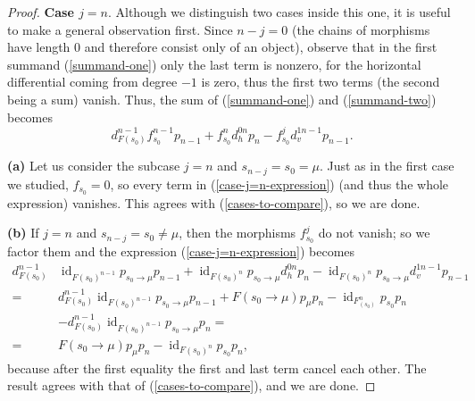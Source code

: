 \documentclass[reqno,11pt]{amsart}
\theoremstyle{plain}
\theoremstyle{remark}
\theoremstyle{definition}
\numberwithin{equation}{thm}
\DeclareMathOperator{\id}{id}
\begin{document}
\begin{proof}
		\textbf{Case $j=n$}. Although we distinguish two cases inside this one, it is useful to make a general observation first. Since $n-j=0$ (the chains of morphisms have length $0$ and therefore consist only of an object), observe that in the first summand (\ref{summand-one}) only the last term is nonzero, for the horizontal differential coming from degree $-1$ is zero, thus the first two terms (the second being a sum) vanish. Thus, the sum of (\ref{summand-one}) and (\ref{summand-two}) becomes
		\begin{equation}\label{case-j=n-expression}
			d_{F(s_0)}^{n-1} f_{s_0}^{n-1} p_{n-1} + f_{s_0}^{n} d_h^{0 n} p_n - f_{s_0}^j d_v^{1 n-1} p_{n-1}.
		\end{equation}
		
		\textbf{(a)} Let us consider the subcase $j=n$ and $s_{n-j}=s_0=\mu$. Just as in the first case we studied, $f_{s_0}=0$, so every term in (\ref{case-j=n-expression}) (and thus the whole expression) vanishes. This agrees with (\ref{cases-to-compare}), so we are done.
		
		\textbf{(b)} If $j=n$ and $s_{n-j}=s_0 \neq \mu$, then the morphisms $f_{s_0}^j$ do not vanish; so we factor them and the expression (\ref{case-j=n-expression}) becomes
		\small
		\begin{equation*}
			\begin{aligned}
				d_{F(s_0)}^{n-1}& \id_{F(s_0)^{n-1}} p_{s_0 \to \mu} p_{n-1} + \id_{F(s_0)^n} p_{s_0 \to \mu} d_h^{0n} p_n - \id_{F(s_0)^n} p_{s_0 \to \mu} d_v^{1 n-1} p_{n-1} \\
				=& d_{F(s_0)}^{n-1} \id_{F(s_0)^{n-1}} p_{s_0 \to \mu} p_{n-1} + F(s_0 \to \mu) p_{\mu} p_n - \id_{F_(s_0)^n} p_{s_0} p_n \\
				&- d_{F(s_0)}^{n-1} \id_{F(s_0)^{n-1}} p_{s_0 \to \mu} p_n = \\
				=& F(s_0 \to \mu) p_{\mu} p_n - \id_{F(s_0)^n} p_{s_0} p_n,
			\end{aligned}
		\end{equation*}
		\normalsize
		because after the first equality the first and last term cancel each other. The result agrees with that of (\ref{cases-to-compare}), and we are done.
	\end{proof}
	
\end{document}
